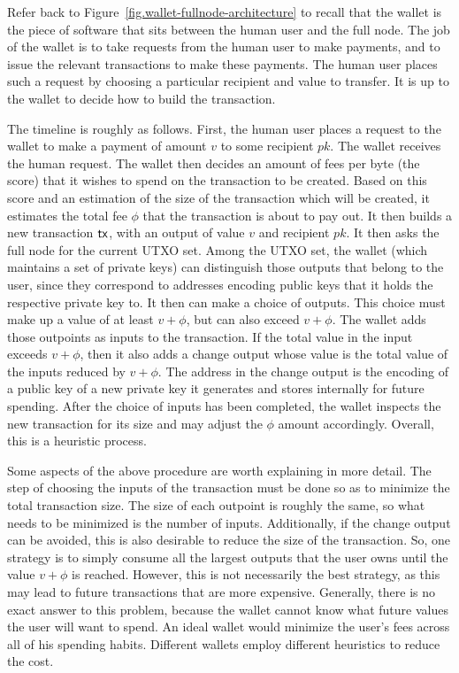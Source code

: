 Refer back to Figure~\ref{fig.wallet-fullnode-architecture} to recall that the wallet
is the piece of software that sits between the human user and the full node. The job of
the wallet is to take requests from the human user to make payments, and to issue the relevant
transactions to make these payments. The human user places such a request by choosing a particular
recipient and value to transfer. It is up to the wallet to decide how to build the transaction.

The timeline is roughly as follows. First, the human user places a request to the wallet
to make a payment of amount $v$ to some recipient $pk$. The wallet receives the human
request. The wallet then decides an amount of fees per byte (the score) that it wishes to spend
on the transaction to be created. Based on this score and an estimation of the size of the
transaction which will be created, it estimates the total fee $\phi$ that the transaction is about
to pay out. It then builds a new transaction
$\mathsf{tx}$, with an output of value $v$ and recipient $pk$. It then asks the full node for
the current UTXO set. Among the UTXO set, the wallet (which maintains a set of private keys)
can distinguish those outputs that belong to the user, since they correspond to addresses
encoding public keys that it holds the respective private key to. It then can make a choice
of outputs. This choice must make up a value of at least $v + \phi$, but can also exceed $v + \phi$.
The wallet adds those outpoints as inputs to the transaction. If the total value in the input
exceeds $v + \phi$, then it also adds a change output whose value is the total value of the
inputs reduced by $v + \phi$. The address in the change output is the encoding of a public
key of a new private key it generates and stores internally for future spending. After
the choice of inputs has been completed, the wallet inspects the new transaction for
its size and may adjust the $\phi$ amount accordingly. Overall, this is a heuristic
process.

Some aspects of the above procedure are worth explaining in more detail. The step of choosing
the inputs of the transaction must be done so as to minimize the total transaction size.
The size of each outpoint is roughly the same, so what needs to be minimized is the number
of inputs. Additionally, if the change output can be avoided, this is also desirable to
reduce the size of the transaction. So, one strategy is to simply consume all the largest
outputs that the user owns until the value $v + \phi$ is reached. However, this is not
necessarily the best strategy, as this may lead to future transactions that are more expensive.
Generally, there is no exact answer to this problem, because the wallet cannot know what
future values the user will want to spend. An ideal wallet would minimize the user's fees
across all of his spending habits. Different wallets employ different heuristics to reduce
the cost.

